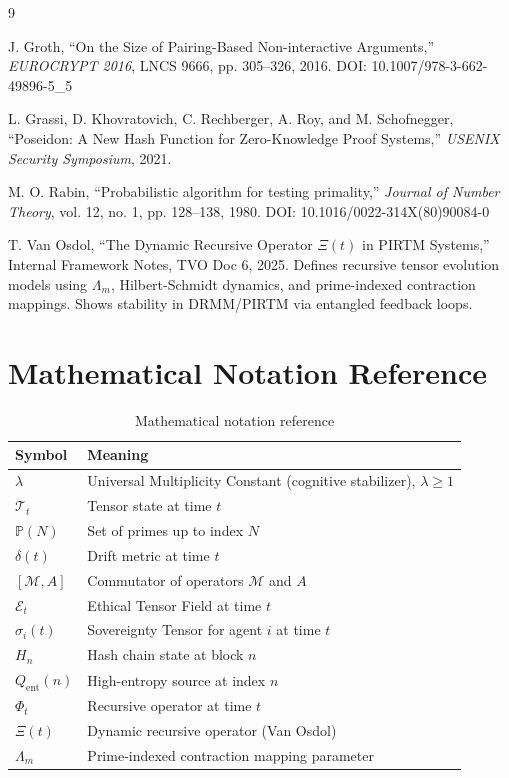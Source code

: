 \documentclass[11pt,a4paper]{article}
\newcommand{\Tensor}[1]{\mathcal{T}_{#1}}
\begin{document}
\begin{thebibliography}{9}

J. Groth, ``On the Size of Pairing-Based Non-interactive Arguments,'' 
\textit{EUROCRYPT 2016}, LNCS 9666, pp. 305--326, 2016.
DOI: 10.1007/978-3-662-49896-5\_5

L. Grassi, D. Khovratovich, C. Rechberger, A. Roy, and M. Schofnegger,
``Poseidon: A New Hash Function for Zero-Knowledge Proof Systems,''
\textit{USENIX Security Symposium}, 2021.

M. O. Rabin, ``Probabilistic algorithm for testing primality,''
\textit{Journal of Number Theory}, vol. 12, no. 1, pp. 128--138, 1980.
DOI: 10.1016/0022-314X(80)90084-0

T. Van Osdol, ``The Dynamic Recursive Operator $\Xi(t)$ in PIRTM Systems,''
Internal Framework Notes, TVO Doc 6, 2025.
Defines recursive tensor evolution models using $\Lambda_m$, Hilbert-Schmidt dynamics, 
and prime-indexed contraction mappings. Shows stability in DRMM/PIRTM via entangled feedback loops.

\end{thebibliography}

\appendix
\section{Mathematical Notation Reference}

\begin{table}[h]
\centering
\begin{tabular}{@{}ll@{}}
\toprule
\textbf{Symbol} & \textbf{Meaning} \\ \midrule
$\lambda$ & Universal Multiplicity Constant (cognitive stabilizer), $\lambda \geq 1$ \\
$\Tensor{t}$ & Tensor state at time $t$ \\
$\mathbb{P}(N)$ & Set of primes up to index $N$ \\
$\delta(t)$ & Drift metric at time $t$ \\
$[\mathcal{M}, A]$ & Commutator of operators $\mathcal{M}$ and $A$ \\
$\mathcal{E}_t$ & Ethical Tensor Field at time $t$ \\
$\sigma_i(t)$ & Sovereignty Tensor for agent $i$ at time $t$ \\
$H_n$ & Hash chain state at block $n$ \\
$Q_{\text{ent}}(n)$ & High-entropy source at index $n$ \\
$\Phi_t$ & Recursive operator at time $t$ \\
$\Xi(t)$ & Dynamic recursive operator (Van Osdol) \\
$\Lambda_m$ & Prime-indexed contraction mapping parameter \\
\bottomrule
\end{tabular}
\caption{Mathematical notation reference}
\end{table}
\end{document}
